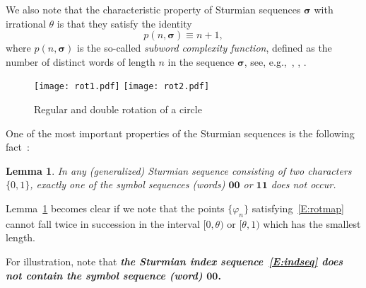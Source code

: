 \documentclass[a4paper,10pt,reqno]{amsart}
\let\cite\citep
\newtheorem{lemma}{Lemma}
\begin{document}
We also note that the characteristic property of Sturmian sequences
$\boldsymbol{\sigma}$ with irrational $\theta$ is that they satisfy the
identity
\begin{equation}\label{E:subwordcompl}
	p(n,\boldsymbol{\sigma})\equiv n+1,
\end{equation}
where $p(n,\boldsymbol{\sigma})$ is the so-called
\emph{subword complexity function}, defined as the number of distinct words
of length $n$ in the sequence $\boldsymbol{\sigma}$, see,
e.g.,~\cite[Sec.~1.2.2]{Lothaire02}, \cite[Sec.~5.1.3]{Fogg02},
\cite[Sec.~6]{BK:BEATCS03}.

\begin{figure}[htbp!]
\centering \mbox{}\hfill{}
{\texttt{[image: rot1.pdf]}}
\hfill{}
{\texttt{[image: rot2.pdf]}}
\hfill\mbox{}\caption{Regular and double rotation of a circle}\label{F:rot}
\end{figure}

One of the most important properties of the Sturmian sequences is the following
fact~\cite[Lemma~6.1.3]{Fogg02}:

\begin{lemma}\label{L:sturmsym}
In any (generalized) Sturmian sequence consisting of two characters
$\{0,1\}$, exactly one of the symbol sequences (words) $\boldsymbol{00}$ or
$\boldsymbol{11}$ does not occur.
\end{lemma}

Lemma~\ref{L:sturmsym} becomes clear if we note that the points
$\{\varphi_{n}\}$ satisfying~\eqref{E:rotmap} cannot fall twice in succession
in the interval $[0,\theta )$ or $[\theta,1)$ which has the smallest length.

For illustration, note that \textbf{\emph{the Sturmian index
sequence~\eqref{E:indseq} does not contain the symbol sequence (word)
$\boldsymbol{00}$}.}
\end{document}
